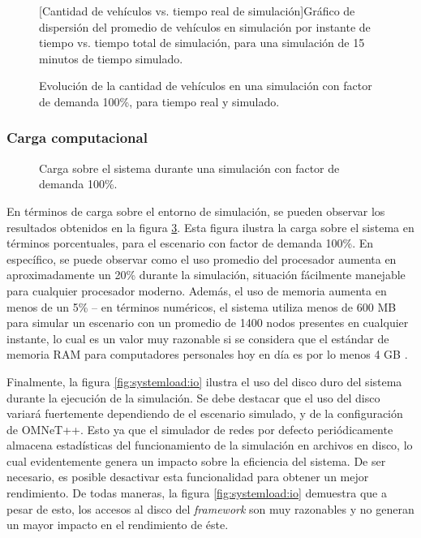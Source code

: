 \begin{figure}[htpb]
    \centering    
    
    [Cantidad de vehículos vs. tiempo real de simulación]{Gráfico de dispersión del promedio de vehículos en simulación por instante de tiempo vs. tiempo total de simulación, para una simulación de 15 minutos de tiempo simulado.}
    \label{fig:vehiclesvstime}
\end{figure}

\begin{figure}[htpb]
    \centering
    
    \caption[Evolución temporal de la cantidad de vehículos en la simulación.]{Evolución de la cantidad de vehículos en una simulación con factor de demanda 100\%, para tiempo real y simulado.}
    \label{fig:timevsvehicles_evolution}
\end{figure}

\subsubsection{Carga computacional}

\begin{figure}[tpb]
    \centering
    
    \caption[Carga sobre el sistema durante una simulación]{Carga sobre el sistema durante una simulación con factor de demanda 100\%.}
    \label{fig:systemload:cpuram}
\end{figure}

En términos de carga sobre el entorno de simulación, se pueden observar los resultados obtenidos en la figura \ref{fig:systemload:cpuram}. Esta figura ilustra la carga sobre el sistema en términos porcentuales, para el escenario con factor de demanda 100\%. En específico, se puede observar como el uso promedio del procesador aumenta en aproximadamente un 20\% durante la simulación, situación fácilmente manejable para cualquier procesador moderno. Además, el uso de memoria aumenta en menos de un 5\% -- en términos numéricos, el sistema utiliza menos de 600 MB para simular un escenario con un promedio de 1400 nodos presentes en cualquier instante, lo cual es un valor muy razonable si se considera que el estándar de memoria RAM para computadores personales hoy en día es por lo menos 4 GB \autocite{steamhwsurvey, unityhardwaresurvey}.

Finalmente, la figura \ref{fig:systemload:io} ilustra el uso del disco duro del sistema durante la ejecución de la simulación. Se debe destacar que el uso del disco variará fuertemente dependiendo de el escenario simulado, y de la configuración de OMNeT++. Esto ya que el simulador de redes por defecto periódicamente almacena estadísticas del funcionamiento de la simulación en archivos en disco, lo cual evidentemente genera un impacto sobre la eficiencia del sistema. De ser necesario, es posible desactivar esta funcionalidad para obtener un mejor rendimiento. De todas maneras, la figura \ref{fig:systemload:io} demuestra que a pesar de esto, los accesos al disco del \emph{framework} son muy razonables y no generan un mayor impacto en el rendimiento de éste.


